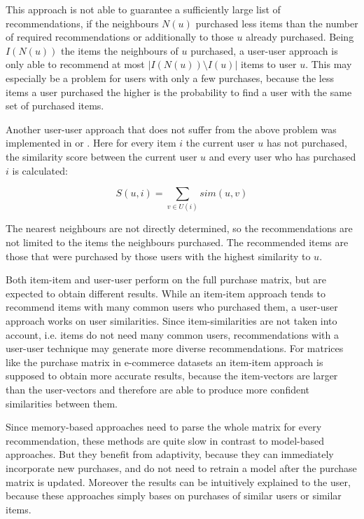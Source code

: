 \documentclass[10pt]{reportMaster}
\begin{document}
This approach is not able to guarantee a sufficiently large list of recommendations, if the neighbours $N(u)$ purchased less items than the number of required recommendations or additionally to those $u$ already purchased.
Being $I(N(u))$ the items the neighbours of $u$ purchased, a user-user approach is only able to recommend at most $|I(N(u)) \setminus I(u)|$ items to user $u$.
This may especially be a problem for users with only a few purchases, because the less items a user purchased the higher is the probability to find a user with the same set of purchased items.

Another user-user approach that does not suffer from the above problem was implemented in \cite{aiolli2013efficient} or \cite{effectiveLatentModels}.
Here for every item $i$ the current user $u$ has not purchased, the similarity score between the current user $u$ and every user who has purchased $i$ is calculated: 

\begin{equation}
	S(u,i) = \sum_{v \in U(i)}{sim(u,v)}
\end{equation}

The nearest neighbours are not directly determined, so the recommendations are not limited to the items the neighbours purchased.
The recommended items are those that were purchased by those users with the highest similarity to $u$.

Both item-item and user-user perform on the full purchase matrix, but are expected to obtain different results.
While an item-item approach tends to recommend items with many common users who purchased them, a user-user approach works on user similarities.
Since item-similarities are not taken into account, i.e. items do not need many common users, recommendations with a user-user technique may generate more diverse recommendations.
For matrices like the purchase matrix in e-commerce datasets an item-item approach is supposed to obtain more accurate results, because the item-vectors are larger than the user-vectors and therefore are able to produce more confident similarities between them. 

Since memory-based approaches need to parse the whole matrix for every recommendation, these methods are quite slow in contrast to model-based approaches.
But they benefit from adaptivity, because they can immediately incorporate new purchases, and do not need to retrain a model after the purchase matrix is updated.
Moreover the results can be intuitively explained to the user, because these approaches simply bases on purchases of similar users or similar items.
\end{document}
